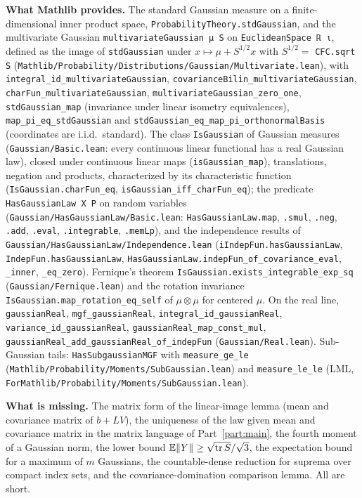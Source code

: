 \textbf{What Mathlib provides.} The standard Gaussian measure on a finite-dimensional inner
product space, \texttt{ProbabilityTheory.stdGaussian}, and the multivariate Gaussian
\texttt{multivariateGaussian μ S} on \texttt{EuclideanSpace ℝ ι}, defined as the image of
\texttt{stdGaussian} under $x \mapsto \mu + S^{1/2}x$ with $S^{1/2} = $ \texttt{CFC.sqrt S}
(\texttt{Mathlib/Probability/Distributions/Gaussian/Multivariate.lean}), with
\texttt{integral\_id\_multivariateGaussian}, \texttt{covarianceBilin\_multivariateGaussian},
\texttt{charFun\_multivariateGaussian}, \texttt{multivariateGaussian\_zero\_one},
\texttt{stdGaussian\_map} (invariance under linear isometry equivalences),
\texttt{map\_pi\_eq\_stdGaussian} and \texttt{stdGaussian\_eq\_map\_pi\_orthonormalBasis}
(coordinates are i.i.d.\ standard). The class \texttt{IsGaussian} of Gaussian measures
(\texttt{Gaussian/Basic.lean}: every continuous linear functional has a real Gaussian law),
closed under continuous linear maps (\texttt{isGaussian\_map}), translations, negation and
products, characterized by its characteristic function
(\texttt{IsGaussian.charFun\_eq}, \texttt{isGaussian\_iff\_charFun\_eq}); the predicate
\texttt{HasGaussianLaw X P} on random variables
(\texttt{Gaussian/HasGaussianLaw/Basic.lean}: \texttt{HasGaussianLaw.map}, \texttt{.smul},
\texttt{.neg}, \texttt{.add}, \texttt{.eval}, \texttt{.integrable}, \texttt{.memLp}), and the
independence results of \texttt{Gaussian/HasGaussianLaw/Independence.lean}
(\texttt{iIndepFun.hasGaussianLaw}, \texttt{IndepFun.hasGaussianLaw},
\texttt{HasGaussianLaw.indepFun\_of\_covariance\_eval}, \texttt{\_inner},
\texttt{\_eq\_zero}). Fernique's theorem \texttt{IsGaussian.exists\_integrable\_exp\_sq}
(\texttt{Gaussian/Fernique.lean}) and the rotation invariance
\texttt{IsGaussian.map\_rotation\_eq\_self} of $\mu \otimes \mu$ for centered $\mu$. On the real
line, \texttt{gaussianReal}, \texttt{mgf\_gaussianReal}, \texttt{integral\_id\_gaussianReal},
\texttt{variance\_id\_gaussianReal}, \texttt{gaussianReal\_map\_const\_mul},
\texttt{gaussianReal\_add\_gaussianReal\_of\_indepFun} (\texttt{Gaussian/Real.lean}).
Sub-Gaussian tails: \texttt{HasSubgaussianMGF} with \texttt{measure\_ge\_le}
(\texttt{Mathlib/Probability/Moments/SubGaussian.lean}) and \texttt{measure\_le\_le}
(LML, \texttt{ForMathlib/Probability/Moments/SubGaussian.lean}).

\textbf{What is missing.} The matrix form of the linear-image lemma (mean and covariance
matrix of $b + LV$), the uniqueness of the law given mean and covariance matrix in the
matrix language of Part~\ref{part:main}, the fourth moment of a Gaussian norm, the
lower bound $\mathbb{E}\lVert Y \rVert \ge \sqrt{\operatorname{tr} S}/\sqrt 3$, the expectation bound for a maximum of $m$
Gaussians, the countable-dense reduction for suprema over compact index sets, and the
covariance-domination comparison lemma. All are short.


